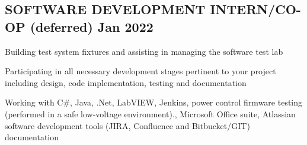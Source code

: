 \documentclass[letter,10pt]{article}
\begin{document}
\subsection{{SOFTWARE DEVELOPMENT INTERN/CO-OP (deferred) \hfill Jan 2022}}
\begin{zitemize}
\item Building test system fixtures and assisting in managing the software test lab
\item Participating in all necessary development stages pertinent to your project including design, code implementation, testing and documentation
\item Working with  C\#, Java, .Net, LabVIEW, Jenkins, power control firmware testing (performed in a safe low-voltage environment)., Microsoft Office suite, Atlassian software development tools (JIRA, Confluence and Bitbucket/GIT) documentation
\end{zitemize}


\end{document}
